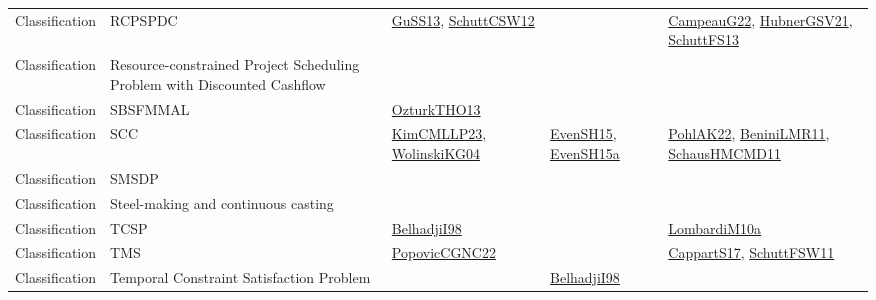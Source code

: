 {\begin{longtable}{lp{3cm}>{\raggedright}p{6cm}>{\raggedright}p{6cm}p{8cm}}
Classification & RCPSPDC & \href{papers/GuSS13.pdf}{GuSS13}\cite{GuSS13}, \href{papers/SchuttCSW12.pdf}{SchuttCSW12}\cite{SchuttCSW12} &  & \href{articles/CampeauG22.pdf}{CampeauG22}\cite{CampeauG22}, \href{articles/HubnerGSV21.pdf}{HubnerGSV21}\cite{HubnerGSV21}, \href{papers/SchuttFS13.pdf}{SchuttFS13}\cite{SchuttFS13}\\
Classification & Resource-constrained Project Scheduling Problem with Discounted Cashflow &  &  & \\
Classification & SBSFMMAL & \href{articles/OzturkTHO13.pdf}{OzturkTHO13}\cite{OzturkTHO13} &  & \\
Classification & SCC & \href{papers/KimCMLLP23.pdf}{KimCMLLP23}\cite{KimCMLLP23}, \href{papers/WolinskiKG04.pdf}{WolinskiKG04}\cite{WolinskiKG04} & \href{papers/EvenSH15.pdf}{EvenSH15}\cite{EvenSH15}, \href{articles/EvenSH15a.pdf}{EvenSH15a}\cite{EvenSH15a} & \href{articles/PohlAK22.pdf}{PohlAK22}\cite{PohlAK22}, \href{articles/BeniniLMR11.pdf}{BeniniLMR11}\cite{BeniniLMR11}, \href{articles/SchausHMCMD11.pdf}{SchausHMCMD11}\cite{SchausHMCMD11}\\
Classification & SMSDP &  &  & \\
Classification & Steel-making and continuous casting &  &  & \\
Classification & TCSP & \href{articles/BelhadjiI98.pdf}{BelhadjiI98}\cite{BelhadjiI98} &  & \href{articles/LombardiM10a.pdf}{LombardiM10a}\cite{LombardiM10a}\\
Classification & TMS & \href{papers/PopovicCGNC22.pdf}{PopovicCGNC22}\cite{PopovicCGNC22} &  & \href{papers/CappartS17.pdf}{CappartS17}\cite{CappartS17}, \href{articles/SchuttFSW11.pdf}{SchuttFSW11}\cite{SchuttFSW11}\\
Classification & Temporal Constraint Satisfaction Problem &  & \href{articles/BelhadjiI98.pdf}{BelhadjiI98}\cite{BelhadjiI98} & \\

\end{longtable}}
